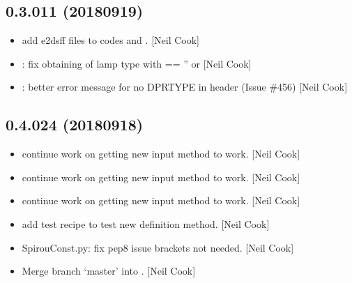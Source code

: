 \documentclass[a4paper,10pt,english]{report}
\begin{document}
\subsection{0.3.011 (2018\sphinxhyphen{}09\sphinxhyphen{}19)}
\label{\detokenize{misc/changelog:id338}}\begin{itemize}
\item {} 
 \sphinxhyphen{} add e2dsff files to  codes and .
{[}Neil Cook{]}

\item {} 
: fix obtaining of lamp type with 
 == ” or  {[}Neil Cook{]}

\item {} 
: better error message for no DPRTYPE in
header (Issue \#456) {[}Neil Cook{]}

\end{itemize}


\subsection{0.4.024 (2018\sphinxhyphen{}09\sphinxhyphen{}18)}
\label{\detokenize{misc/changelog:id339}}\begin{itemize}
\item {} 
 \sphinxhyphen{} continue work on getting new input method to work.
{[}Neil Cook{]}

\item {} 
 \sphinxhyphen{} continue work on getting new input method to work.
{[}Neil Cook{]}

\item {} 
 \sphinxhyphen{} continue work on getting new input method to work.
{[}Neil Cook{]}

\item {} 
 \sphinxhyphen{} add test recipe to test new definition method. {[}Neil
Cook{]}

\item {} 
SpirouConst.py: fix pep8 issue \sphinxhyphen{} brackets not needed. {[}Neil Cook{]}

\item {} 
Merge branch ‘master’ into . {[}Neil Cook{]}

\end{itemize}
\end{document}
